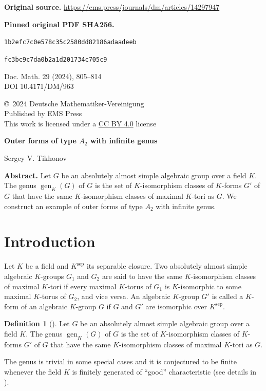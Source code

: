 \documentclass[10pt]{article}
\theoremstyle{definition}
\newtheorem{definition}[theorem]{Definition}
\DeclareMathOperator{\gen}{gen}
\newcommand{\sourcepage}[1]{\label{source-page-#1}}
\begin{document}
\noindent\textbf{Original source.} \url{https://ems.press/journals/dm/articles/14297947}

\noindent\textbf{Pinned original PDF SHA256.}\par
\noindent\texttt{1b2efc7c0e578c35c2580dd82186adaadeeb}\par
\noindent\texttt{fc3bc9c7da0b2a1d201734c705c9}

\clearpage
\setcounter{page}{805}
\sourcepage{1}
\noindent\begin{minipage}[t]{.47\textwidth}\small
Doc. Math. 29 (2024), 805--814\\ DOI 10.4171/DM/963
\end{minipage}\hfill\begin{minipage}[t]{.52\textwidth}\small\raggedleft
\copyright\ 2024 Deutsche Mathematiker-Vereinigung\\Published by EMS Press\\
This work is licensed under a \href{https://creativecommons.org/licenses/by/4.0/}{CC BY 4.0} license
\end{minipage}
\begin{center}\vspace{12pt}
{\Large\bfseries Outer forms of type $A_2$ with infinite genus}\par\vspace{10pt}
{\large Sergey V. Tikhonov}\par\vspace{10pt}
\end{center}
\noindent\textbf{Abstract.} Let $G$ be an absolutely almost simple algebraic group over a field $K$. The genus $\gen_K(G)$ of $G$ is the set of $K$-isomorphism classes of $K$-forms $G'$ of $G$ that have the same $K$-isomorphism classes of maximal $K$-tori as $G$. We construct an example of outer forms of type $A_2$ with infinite genus.
\section{Introduction}
Let $K$ be a field and $K^{\mathrm{sep}}$ its separable closure. Two absolutely almost simple algebraic $K$-groups $G_1$ and $G_2$ are said to have the same $K$-isomorphism classes of maximal $K$-tori if every maximal $K$-torus of $G_1$ is $K$-isomorphic to some maximal $K$-torus of $G_2$, and vice versa. An algebraic $K$-group $G'$ is called a $K$-form of an algebraic $K$-group $G$ if $G$ and $G'$ are isomorphic over $K^{\mathrm{sep}}$.
\begin{definition}[{\cite[Def. 6.1]{r2}}]
Let $G$ be an absolutely almost simple algebraic group over a field $K$. The genus $\gen_K(G)$ of $G$ is the set of $K$-isomorphism classes of $K$-forms $G'$ of $G$ that have the same $K$-isomorphism classes of maximal $K$-tori as $G$.
\end{definition}
The genus is trivial in some special cases and it is conjectured to be finite whenever the field $K$ is finitely generated of ``good'' characteristic (see details in \cite[\S8]{r6}).
\end{document}
